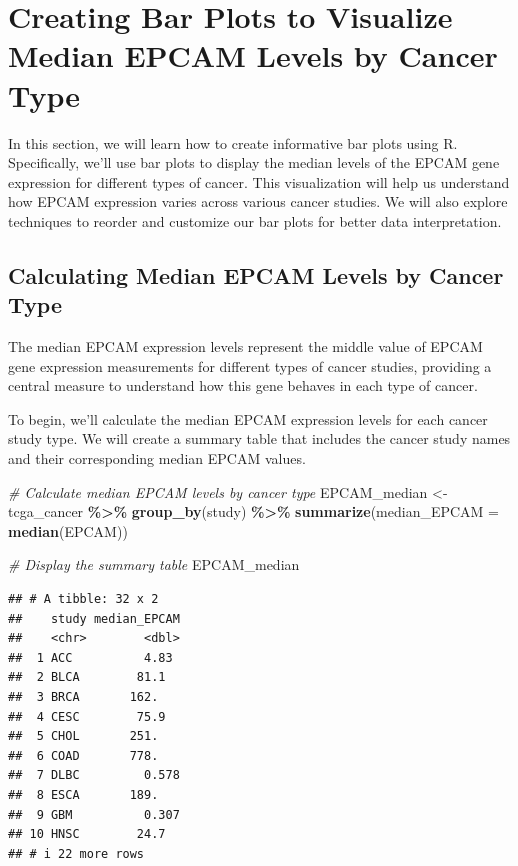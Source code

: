 \documentclass[
]{book}
\newenvironment{Shaded}{\begin{snugshade}}{\end{snugshade}}
\newcommand{\AttributeTok}[1]{\textcolor[rgb]{0.13,0.29,0.53}{#1}}
\newcommand{\CommentTok}[1]{\textcolor[rgb]{0.56,0.35,0.01}{\textit{#1}}}
\newcommand{\FunctionTok}[1]{\textcolor[rgb]{0.13,0.29,0.53}{\textbf{#1}}}
\newcommand{\NormalTok}[1]{#1}
\newcommand{\OtherTok}[1]{\textcolor[rgb]{0.56,0.35,0.01}{#1}}
\newcommand{\SpecialCharTok}[1]{\textcolor[rgb]{0.81,0.36,0.00}{\textbf{#1}}}
\begin{document}
\hypertarget{creating-bar-plots-to-visualize-median-epcam-levels-by-cancer-type}{%
\section{Creating Bar Plots to Visualize Median EPCAM Levels by Cancer Type}\label{creating-bar-plots-to-visualize-median-epcam-levels-by-cancer-type}}

In this section, we will learn how to create informative bar plots using R. Specifically, we'll use bar plots to display the median levels of the EPCAM gene expression for different types of cancer. This visualization will help us understand how EPCAM expression varies across various cancer studies. We will also explore techniques to reorder and customize our bar plots for better data interpretation.

\hypertarget{calculating-median-epcam-levels-by-cancer-type}{%
\subsection{Calculating Median EPCAM Levels by Cancer Type}\label{calculating-median-epcam-levels-by-cancer-type}}

The median EPCAM expression levels represent the middle value of EPCAM gene expression measurements for different types of cancer studies, providing a central measure to understand how this gene behaves in each type of cancer.

To begin, we'll calculate the median EPCAM expression levels for each cancer study type. We will create a summary table that includes the cancer study names and their corresponding median EPCAM values.

\begin{Shaded}
\begin{Highlighting}[]
\CommentTok{\# Calculate median EPCAM levels by cancer type}
\NormalTok{EPCAM\_median }\OtherTok{\textless{}{-}}\NormalTok{ tcga\_cancer }\SpecialCharTok{\%\textgreater{}\%}
  \FunctionTok{group\_by}\NormalTok{(study) }\SpecialCharTok{\%\textgreater{}\%}
  \FunctionTok{summarize}\NormalTok{(}\AttributeTok{median\_EPCAM =} \FunctionTok{median}\NormalTok{(EPCAM))}

\CommentTok{\# Display the summary table}
\NormalTok{EPCAM\_median}
\end{Highlighting}
\end{Shaded}

\begin{verbatim}
## # A tibble: 32 x 2
##    study median_EPCAM
##    <chr>        <dbl>
##  1 ACC          4.83 
##  2 BLCA        81.1  
##  3 BRCA       162.   
##  4 CESC        75.9  
##  5 CHOL       251.   
##  6 COAD       778.   
##  7 DLBC         0.578
##  8 ESCA       189.   
##  9 GBM          0.307
## 10 HNSC        24.7  
## # i 22 more rows
\end{verbatim}
\end{document}
